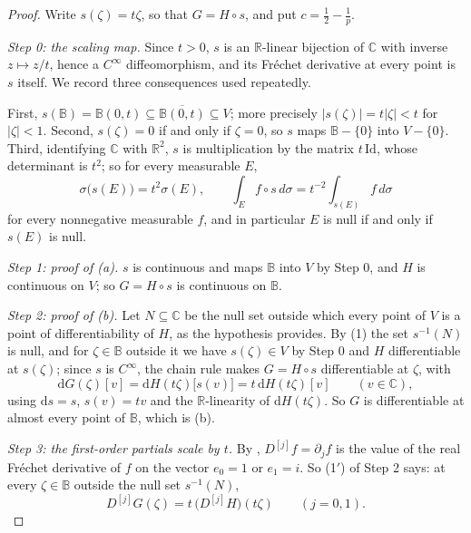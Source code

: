 \begin{proof}
Write $s(\zeta)=t\zeta$, so that $G=H\circ s$, and put $c=\tfrac12-\tfrac1p$.

\emph{Step 0: the scaling map.}  Since $t>0$, $s$ is an $\mathbb{R}$-linear
bijection of $\mathbb{C}$ with inverse $z\mapsto z/t$, hence a $C^\infty$
diffeomorphism, and its Fréchet derivative at every point is $s$ itself.  We
record three consequences used repeatedly.

First, $s(\mathbb{B})=\mathbb{B}(0,t)\subseteq\overline{\mathbb{B}(0,t)}\subseteq V$;
more precisely $|s(\zeta)|=t|\zeta|<t$ for $|\zeta|<1$.  Second,
$s(\zeta)=0$ if and only if $\zeta=0$, so $s$ maps $\mathbb{B}-\{0\}$ into
$V-\{0\}$.  Third, identifying $\mathbb{C}$ with $\mathbb{R}^2$, $s$ is
multiplication by the matrix $t\,\mathrm{Id}$, whose determinant is $t^2$; so
for every measurable $E$,
\begin{equation}\tag{1}
  \sigma\bigl(s(E)\bigr)=t^2\sigma(E),\qquad
  \int_{E}f\circ s\,d\sigma=t^{-2}\int_{s(E)}f\,d\sigma
\end{equation}
for every nonnegative measurable $f$, and in particular $E$ is null if and only
if $s(E)$ is null.

\emph{Step 1: proof of (a).}  $s$ is continuous and maps $\mathbb{B}$ into $V$
by Step 0, and $H$ is continuous on $V$; so $G=H\circ s$ is continuous on
$\mathbb{B}$.

\emph{Step 2: proof of (b).}  Let $N\subseteq\mathbb{C}$ be the null set
outside which every point of $V$ is a point of differentiability of $H$, as the
hypothesis provides.  By (1) the set $s^{-1}(N)$ is null, and for
$\zeta\in\mathbb{B}$ outside it we have $s(\zeta)\in V$ by Step 0 and $H$
differentiable at $s(\zeta)$; since $s$ is $C^\infty$, the chain rule makes
$G=H\circ s$ differentiable at $\zeta$, with
\begin{equation}\tag{1$'$}
  \mathrm{d}G(\zeta)[v]=\mathrm{d}H(t\zeta)\bigl[s(v)\bigr]
  =t\,\mathrm{d}H(t\zeta)[v]\qquad(v\in\mathbb{C}),
\end{equation}
using $\mathrm{d}s=s$, $s(v)=tv$ and the $\mathbb{R}$-linearity of
$\mathrm{d}H(t\zeta)$.  So $G$ is differentiable at almost every point of
$\mathbb{B}$, which is (b).

\emph{Step 3: the first-order partials scale by $t$.}  By
, $D^{[j]}f=\partial_jf$ is the value of the real
Fr\'echet derivative of $f$ on the vector $e_0=1$ or $e_1=i$.  So (1$'$) of
Step 2 says: at every $\zeta\in\mathbb{B}$ outside the null set $s^{-1}(N)$,
\begin{equation}\tag{1$''$}
  D^{[j]}G(\zeta)=t\,\bigl(D^{[j]}H\bigr)(t\zeta)\qquad(j=0,1).
\end{equation}


\end{proof}

